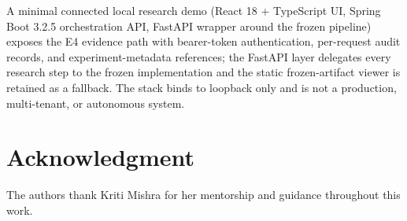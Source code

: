 \documentclass[conference]{IEEEtran}
\begin{document}
A minimal connected local research demo (React 18 + TypeScript UI,
Spring Boot 3.2.5 orchestration API, FastAPI wrapper around the frozen
pipeline) exposes the E4 evidence path with bearer-token authentication,
per-request audit records, and experiment-metadata references; the FastAPI
layer delegates every research step to the frozen implementation and the
static frozen-artifact viewer is retained as a fallback. The stack binds to
loopback only and is not a production, multi-tenant, or autonomous system.

\section*{Acknowledgment}

The authors thank Kriti Mishra for her mentorship and guidance throughout this work.
\end{document}
